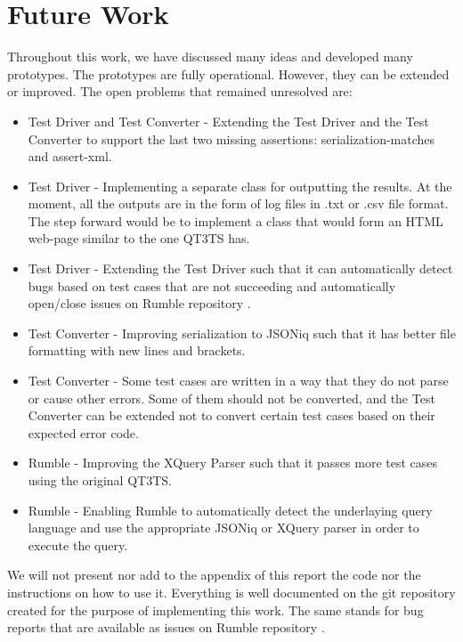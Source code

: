 \section{Future Work}
Throughout this work, we have discussed many ideas and developed many prototypes. The prototypes are fully operational. However, they can be extended or improved. The open problems that remained unresolved are:
\begin{itemize}
	\item Test Driver and Test Converter - Extending the Test Driver and the Test Converter to support the last two missing assertions: serialization-matches and assert-xml.
	\item Test Driver - Implementing a separate class for outputting the results. At the moment, all the outputs are in the form of log files in .txt or .csv file format. The step forward would be to implement a class that would form an HTML web-page similar to the one QT3TS has.
	\item Test Driver - Extending the Test Driver such that it can automatically detect bugs based on test cases that are not succeeding and automatically open/close issues on Rumble repository \cite{RumbleRepository}.
	\item Test Converter - Improving serialization to JSONiq such that it has better file formatting with new lines and brackets.
	\item Test Converter - Some test cases are written in a way that they do not parse or cause other errors. Some of them should not be converted, and the Test Converter can be extended not to convert certain test cases based on their expected error code.
	\item Rumble - Improving the XQuery Parser such that it passes more test cases using the original QT3TS.
	\item Rumble - Enabling Rumble to automatically detect the underlaying query language and use the appropriate JSONiq or XQuery parser in order to execute the query. 
\end{itemize}

We will not present nor add to the appendix of this report the code nor the instructions on how to use it. Everything is well documented on the git repository \cite{StevanRepo} created for the purpose of implementing this work. The same stands for bug reports that are available as issues on Rumble repository \cite{IssuesSubmitted}.